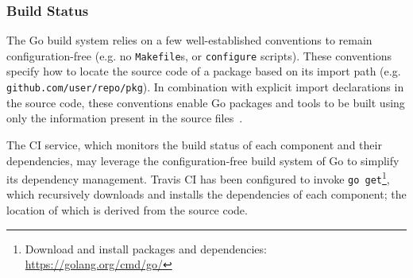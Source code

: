 
\subsubsection{Build Status}

The Go build system relies on a few well-established conventions to remain configuration-free (e.g. no \texttt{Makefile}s, or \texttt{configure} scripts). These conventions specify how to locate the source code of a package based on its import path (e.g. \texttt{github.com/user/repo/pkg}). In combination with explicit import declarations in the source code, these conventions enable Go packages and tools to be built using only the information present in the source files~\cite{go_command}.

The CI service, which monitors the build status of each component and their dependencies, may leverage the configuration-free build system of Go to simplify its dependency management. Travis CI has been configured to invoke \texttt{go get}\footnote{Download and install packages and dependencies: \url{https://golang.org/cmd/go/}}, which recursively downloads and installs the dependencies of each component; the location of which is derived from the source code.
